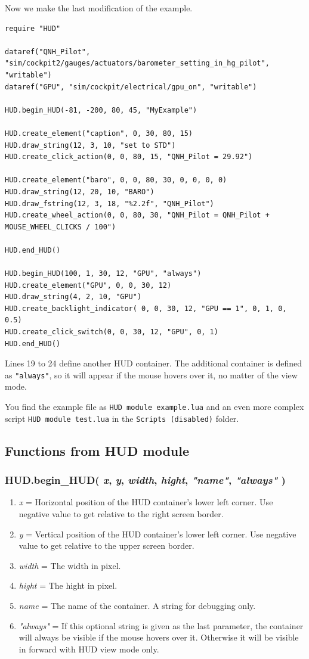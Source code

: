 \documentclass[11pt,parskip=half,a4paper]{scrartcl}
\begin{document}
Now we make the last modification of the example.

\begin{lstlisting}[firstnumber=1]
require "HUD"

dataref("QNH_Pilot", "sim/cockpit2/gauges/actuators/barometer_setting_in_hg_pilot", "writable")
dataref("GPU", "sim/cockpit/electrical/gpu_on", "writable")

HUD.begin_HUD(-81, -200, 80, 45, "MyExample")

HUD.create_element("caption", 0, 30, 80, 15)
HUD.draw_string(12, 3, 10, "set to STD")
HUD.create_click_action(0, 0, 80, 15, "QNH_Pilot = 29.92")

HUD.create_element("baro", 0, 0, 80, 30, 0, 0, 0, 0)
HUD.draw_string(12, 20, 10, "BARO")
HUD.draw_fstring(12, 3, 18, "%2.2f", "QNH_Pilot")
HUD.create_wheel_action(0, 0, 80, 30, "QNH_Pilot = QNH_Pilot + MOUSE_WHEEL_CLICKS / 100")

HUD.end_HUD()

HUD.begin_HUD(100, 1, 30, 12, "GPU", "always")
HUD.create_element("GPU", 0, 0, 30, 12)
HUD.draw_string(4, 2, 10, "GPU")
HUD.create_backlight_indicator( 0, 0, 30, 12, "GPU == 1", 0, 1, 0, 0.5)
HUD.create_click_switch(0, 0, 30, 12, "GPU", 0, 1)
HUD.end_HUD()
\end{lstlisting}

Lines 19 to 24 define another HUD container. The additional container is defined as \verb|"always"|, so it will appear if the mouse hovers over it, no matter of the view mode.

You find the example file as \verb|HUD module example.lua| and an even more complex script \verb|HUD module test.lua| in the \verb|Scripts (disabled)| folder.

\subsection{Functions from HUD module}

\subsubsection{HUD.begin\_HUD( \emph{x}, \emph{y}, \emph{width}, \emph{hight}, \emph{"name"}, \emph{"always"} )}

\begin{enumerate}
	\item \emph{x} = Horizontal position of the HUD container's lower left corner. Use negative value to get relative to the right screen border.
	\item \emph{y} = Vertical position of the HUD container's lower left corner. Use negative value to get relative to the upper screen border.
	\item \emph{width} = The width in pixel.
	\item \emph{hight} = The hight in pixel.
	\item \emph{name} = The name of the container. A string for debugging only.
	\item \emph{"always"} = If this optional string is given as the last parameter, the container will always be visible if the mouse hovers over it. Otherwise it will be visible in forward with HUD view mode only.
\end{enumerate}
\end{document}
